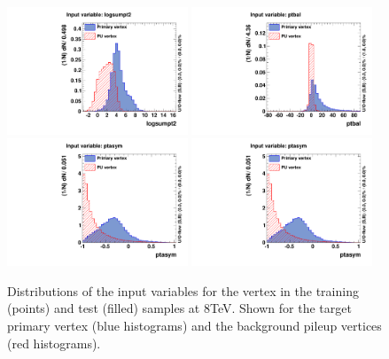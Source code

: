 \begin{figure}
  \includegraphics[width=0.48\textwidth]{ch3_comm_anal_comps/plots/vertex_bdt_input0.pdf}
  \includegraphics[width=0.48\textwidth]{ch3_comm_anal_comps/plots/vertex_bdt_input1.pdf} \\
  \includegraphics[width=0.48\textwidth]{ch3_comm_anal_comps/plots/vertex_bdt_input2.pdf}
  \includegraphics[width=0.48\textwidth]{ch3_comm_anal_comps/plots/vertex_bdt_input3.pdf}
  \caption{Distributions of the input variables for the vertex \BDT in the \MC \Hgg training (points) and test (filled) samples at 8TeV. Shown for the target primary vertex (blue histograms) and the background pileup vertices (red histograms). }
  \label{fig:vertex_bdt_inputs}
\end{figure}

